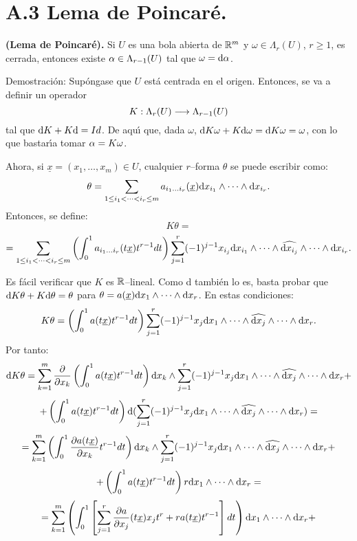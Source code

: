 \documentclass[cursovd_portada.tex]{subfiles}
\begin{document}
\section*{A.3 Lema de Poincar\'{e}.}
\begin{teoap}
{\bf (Lema de Poincar\'{e}).} Si $U$ es una bola abierta de $\mathbb{R}^m$ y $\omega\in \Lambda_r(U)$, $r\geq 1$, es cerrada,
entonces existe $\alpha\in\Lambda_{r-1}(U)$ tal que $\omega={\rm d} \alpha$.
\end{teoap}
{\sc Demostraci\'{o}n:} Sup\'{o}ngase que $U$ est\'{a} centrada en el origen. Entonces, se va a definir un operador
$$K:\Lambda_r(U)\longrightarrow\Lambda_{r-1}(U)$$
tal que ${\rm d} K+K{\rm d} =Id$. De aqu\'{\i} que, dada $\omega$, ${\rm d} K\omega+ K{\rm d} \omega={\rm d} K\omega=\omega$, con lo que
bastar\'{\i}a tomar $\alpha=K\omega$.
\par
Ahora, si $\underline{x}=(x_1,\dots ,x_m)\in U$, cualquier $r$--forma $\theta$ se puede escribir como:
$$\theta=\sum_{1\leq i_1 <\cdots <i_r\leq m}a_{i_1\dots i_r}(\underline{x})
{\rm d} x_{i_1}\wedge\cdots\wedge{\rm d} x_{i_r}.$$ \hs Entonces, se define:
$$K\theta=$$
$$=\sum_{1\leq i_1 <\cdots <i_r\leq m}\left( \int_0^1 a_{i_1\dots i_r}(t\underline{x})t^{r-1}dt\right)
\sum_{j=1}^r(-1)^ {j-1}x_{i_j}{\rm d} x_{i_1}\wedge\cdots\wedge\widehat{{\rm d} x_{i_j}}\wedge \cdots\wedge{\rm d} x_{i_r}.$$
\par\medskip
Es f\'{a}cil verificar que $K$ es $\mathbb{R}$--lineal. Como d tambi\'{e}n lo es, basta probar que ${\rm d} K\theta+K{\rm d} \theta=\theta$ para $\theta=a(\underline{x}) {\rm d} x_1\wedge\cdots\wedge{\rm d} x_r$. En estas condiciones:
$$K\theta=\left( \int_0^1 a(t\underline{x})t^{r-1}dt\right) \sum_{j=1}^r(-1)^
{j-1}x_j{\rm d} x_1\wedge\cdots\wedge\widehat{{\rm d} x_j}\wedge\cdots\wedge {\rm d} x_r.$$ \hs Por tanto:
$${\rm d} K\theta=\sum_{k=1}^m\displaystyle{\frac{\partial}{\partial x_k}}\left( \int_0^1 a(t\underline{x})t^{r-1}
dt\right){\rm d} x_k\wedge\sum_{j=1}^r(-1)^{j-1}x_j{\rm d} x_1\wedge\cdots\wedge \widehat{{\rm d} x_j}\wedge\cdots\wedge{\rm d} x_r+$$
$$+\left( \int_0^1 a(t\underline{x})t^{r-1}dt\right) {\rm d} (\sum_{j=1}^r(-1)^
{j-1}x_j{\rm d} x_1\wedge\cdots\wedge\widehat{{\rm d} x_j}\wedge\cdots \wedge{\rm d} x_r)=$$
$$=\sum_{k=1}^m\left( \int_0^1 \displaystyle{\frac{\partial a(t\underline{x})}{\partial x_k}}t^{r-1}
dt\right){\rm d} x_k\wedge\sum_{j=1}^r(-1)^{j-1}x_j{\rm d} x_1\wedge\cdots\wedge \widehat{{\rm d} x_j}\wedge\cdots\wedge{\rm d} x_r+$$
$$+\left( \int_0^1 a(t\underline{x})t^{r-1}dt\right) r{\rm d} x_1\wedge\cdots
\wedge{\rm d} x_r=$$
$$=\sum_{k=1}^m\left( \int_0^1 \left[ \sum_{j=1}^r\displaystyle{\frac{\partial a}{\partial x_j}}(t\underline{x})
x_jt^r+ra(t\underline{x})t^{r-1}\right] dt\right) {\rm d} x_1\wedge\cdots\wedge {\rm d} x_r+$$
\end{document}
